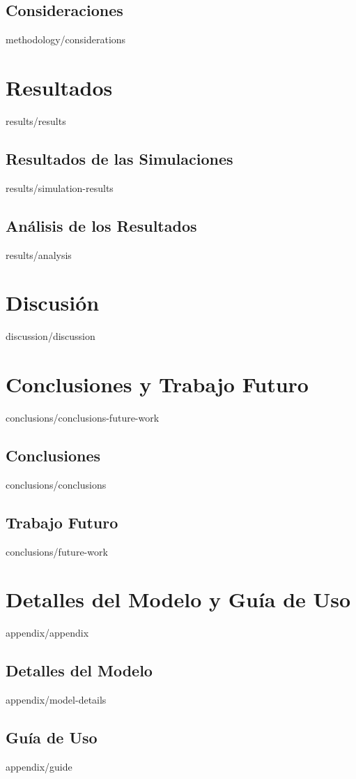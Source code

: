 \documentclass[epsbased,copyright,final,extendedindex,firstnumbered,tfm,gnuplot,spanish,loa,loe,lof,lot]{tfgtfmthesisuam} %
\begin{document}
  \section{Consideraciones\label{SEC:CONSIDERATIONS}}{methodology/considerations}

\chapter{Resultados\label{CAP:RESULTS}}{results/results}
  \section{Resultados de las Simulaciones\label{SEC:SIMULATIONRESULTS}}{results/simulation-results}
  \section{Análisis de los Resultados\label{SEC:ANALYSIS}}{results/analysis}

\chapter{Discusión\label{SEC:DISCUSSION}}{discussion/discussion}

\chapter{Conclusiones y Trabajo Futuro\label{CAP:CONCLUSIONS}}{conclusions/conclusions-future-work}
  \section{Conclusiones\label{SEC:CONCLUSIONS}}{conclusions/conclusions}
  \section{Trabajo Futuro\label{SEC:FUTUREWORK}}{conclusions/future-work}

\appendix

\chapter{Detalles del Modelo y Guía de Uso\label{CAP:APPENDIX}}{appendix/appendix}
  \section{Detalles del Modelo\label{SEC:MODELDETAILS}}{appendix/model-details}
  \section{Guía de Uso\label{SEC:GUIDE}}{appendix/guide}
\end{document}
